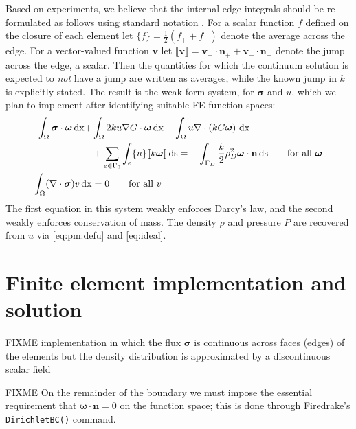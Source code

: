 \documentclass[11pt]{amsart}
\newcommand{\bn}{\mathbf{n}}
\newcommand{\bv}{\mathbf{v}}
\newcommand{\bsigma}{\bm{\sigma}}
\newcommand{\bomega}{\bm{\omega}}
\newcommand{\dx}{\mathrm{dx}}
\newcommand{\ds}{\mathrm{ds}}
\newcommand{\Div}{\nabla\cdot}
\newcommand{\grad}{\nabla}
\newcommand{\jump}[1]{\llbracket #1 \rrbracket }
\begin{document}
Based on experiments, we believe that the internal edge integrals should be re-formulated as follows using standard notation \citep{Arnold2002}.  For a scalar function $f$ defined on the closure of each element let $\{f\} = \frac{1}{2} (f_+ + f_-)$ denote the average across the edge.  For a vector-valued function $\bv$ let $\jump{\bv} = \bv_+ \cdot \bn_+ + \bv_- \cdot \bn_-$ denote the jump across the edge, a scalar.  Then the quantities for which the continuum solution is expected to \emph{not} have a jump are written as averages, while the known jump in $k$ is explicitly stated.  The result is the weak form system, for $\bsigma$ and $u$, which we plan to implement after identifying suitable FE function spaces: 
\begin{subequations}
\label{eq:weaku}
\begin{align}
\int_\Omega \bsigma\cdot \bomega\,\dx + &\int_\Omega 2 k u \grad G \cdot \bomega\,\dx - \int_\Omega u \Div\left(k G \bomega\right)\,\dx  \label{eq:weaku:darcy} \\
&+ \sum_{e\in\Gamma_0} \int_e \{u\} \jump{k\bomega}\,\ds = - \int_{\Gamma_D} \frac{k}{2} \rho_D^2 \bomega\cdot\bn\,\ds \qquad \text{for all } \bomega \notag \\
\int_\Omega (\Div \bsigma) v\,\dx &= 0 \qquad \text{for all } v  \label{eq:weaku:masscont}
\end{align}
\end{subequations}
The first equation in this system weakly enforces Darcy's law, and the second weakly enforces conservation of mass.  The density $\rho$ and pressure $P$ are recovered from $u$ via \eqref{eq:pm:defu} and \eqref{eq:ideal}.

\section{Finite element implementation and solution}

FIXME implementation in which the flux $\bsigma$ is continuous across faces (edges) of the elements but the density distribution is approximated by a discontinuous scalar field

FIXME  On the remainder of the boundary we must impose the essential requirement that $\bomega\cdot \bn=0$ on the function space; this is done through Firedrake's \verb|DirichletBC()| command.
\end{document}
